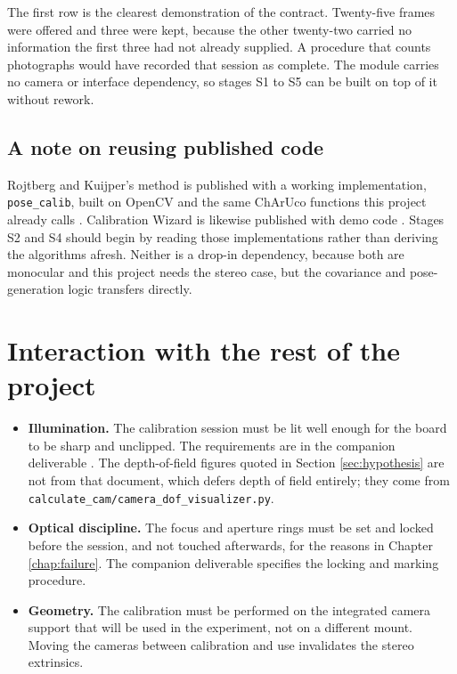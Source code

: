 The first row is the clearest demonstration of the contract. Twenty-five frames were offered and three were kept, because the other twenty-two carried no information the first three had not already supplied. A procedure that counts photographs would have recorded that session as complete. The module carries no camera or interface dependency, so stages S1 to S5 can be built on top of it without rework.

\subsection{A note on reusing published code}

Rojtberg and Kuijper's method is published with a working implementation, \texttt{pose\_calib}, built on OpenCV and the same ChArUco functions this project already calls \cite{rojtberg2018pose}. Calibration Wizard is likewise published with demo code \cite{peng2019wizard}. Stages S2 and S4 should begin by reading those implementations rather than deriving the algorithms afresh. Neither is a drop-in dependency, because both are monocular and this project needs the stereo case, but the covariance and pose-generation logic transfers directly.

\section{Interaction with the rest of the project}

\begin{itemize}
    \item \textbf{Illumination.} The calibration session must be lit well enough for the board to be sharp and unclipped. The requirements are in the companion deliverable \cite{linku_darkroom_illumination}. The depth-of-field figures quoted in Section \ref{sec:hypothesis} are not from that document, which defers depth of field entirely; they come from \texttt{calculate\_cam/\allowbreak camera\_dof\_visualizer.py}.
    \item \textbf{Optical discipline.} The focus and aperture rings must be set and locked before the session, and not touched afterwards, for the reasons in Chapter \ref{chap:failure}. The companion deliverable specifies the locking and marking procedure.
    \item \textbf{Geometry.} The calibration must be performed on the integrated camera support that will be used in the experiment, not on a different mount. Moving the cameras between calibration and use invalidates the stereo extrinsics.
\end{itemize}

